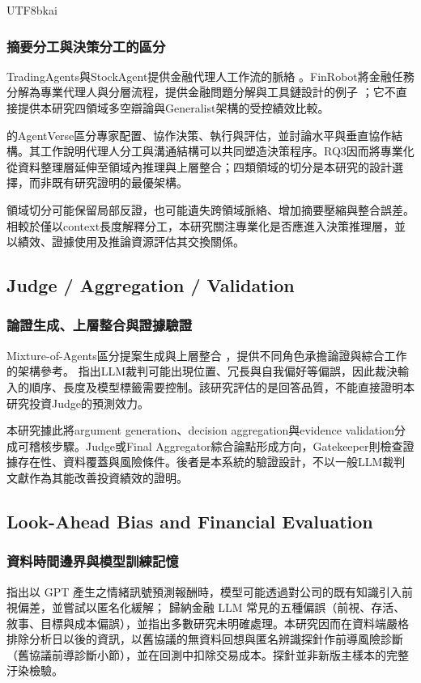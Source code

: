 \documentclass[12pt,a4paper]{article}
\begin{document}
\begin{CJK}{UTF8}{bkai}
\subsubsection{摘要分工與決策分工的區分}
TradingAgents與StockAgent提供金融代理人工作流的脈絡 \citep{xiao2024tradingagents,zhang2024stockagent}。FinRobot將金融任務分解為專業代理人與分層流程，提供金融問題分解與工具鏈設計的例子 \citep{yang2024finrobot}；它不直接提供本研究四領域多空辯論與Generalist架構的受控績效比較。

\citet{chen2023agentverse} 的AgentVerse區分專家配置、協作決策、執行與評估，並討論水平與垂直協作結構。其工作說明代理人分工與溝通結構可以共同塑造決策程序。RQ3因而將專業化從資料整理層延伸至領域內推理與上層整合；四類領域的切分是本研究的設計選擇，而非既有研究證明的最優架構。

領域切分可能保留局部反證，也可能遺失跨領域脈絡、增加摘要壓縮與整合誤差。相較於僅以context長度解釋分工，本研究關注專業化是否應進入決策推理層，並以績效、證據使用及推論資源評估其交換關係。

\subsection{Judge / Aggregation / Validation}
\subsubsection{論證生成、上層整合與證據驗證}
Mixture-of-Agents區分提案生成與上層整合 \citep{wang2024moa}，提供不同角色承擔論證與綜合工作的架構參考。\citet{zheng2023judge} 指出LLM裁判可能出現位置、冗長與自我偏好等偏誤，因此裁決輸入的順序、長度及模型標籤需要控制。該研究評估的是回答品質，不能直接證明本研究投資Judge的預測效力。

本研究據此將argument generation、decision aggregation與evidence validation分成可稽核步驟。Judge或Final Aggregator綜合論點形成方向，Gatekeeper則檢查證據存在性、資料覆蓋與風險條件。後者是本系統的驗證設計，不以一般LLM裁判文獻作為其能改善投資績效的證明。

\subsection{Look-Ahead Bias and Financial Evaluation}

\subsubsection{資料時間邊界與模型訓練記憶}
\citet{glasserman2023lookahead} 指出以 GPT 產生之情緒訊號預測報酬時，模型可能透過對公司的既有知識引入前視偏差，並嘗試以匿名化緩解；\citet{kong2026bias} 歸納金融 LLM 常見的五種偏誤（前視、存活、敘事、目標與成本偏誤），並指出多數研究未明確處理。本研究因而在資料端嚴格排除分析日以後的資訊，以舊協議的無資料回想與匿名辨識探針作前導風險診斷（舊協議前導診斷小節），並在回測中扣除交易成本。探針並非新版主樣本的完整汙染檢驗。

\end{CJK}
\end{document}
